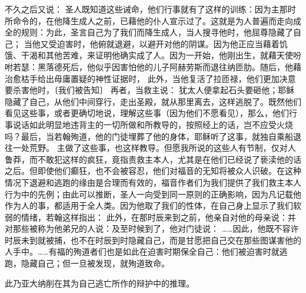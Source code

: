不久之后又说： 圣人既知道这些诫命，他们行事就有了这样的训练：因为主那时所命令的，在他降生成人之前，已藉他的仆人宣示过了。这就是为人普遍而走向成全的规则：为此，圣言自己为了我们而降生成人，当人搜寻他时，他屈尊隐藏了自己； 当他又受迫害时，他俯就退避，以避开对他的阴谋。因为他正应当藉着饥饿、干渴和其他苦难，来证明他确实成了人。因为一开始，他刚出生，就藉天使吩咐若瑟：黑落德死后，他似乎因害怕他的儿子阿赫劳斯而退往纳匝肋。随后，他藉治愈枯手给出毋庸置疑的神性证据时， 此外，当他复活了拉匝禄，他们更加决意要杀害他时，〔我们被告知〕 再者，当救主说： 犹太人便拿起石头要砸他；耶稣隐藏了自己，从他们中间穿行，走出圣殿，就从那里离去，这样逃脱了。既然他们看见这些事，或者更确切地说，理解这些事（因为他们不愿看见），那么，他们行事说话如此明显地违背主的一切所做和所教导的，按照经上的话，岂不应受火烧吗？最后，当若翰殉道，他的门徒埋葬了他的身体，耶稣听了这事，就独自乘船退往一处荒野。 主做了这些事，也这样教导。但愿我所说的这些人有节制，仅对人鲁莽，而不敢犯这样的疯狂，竟指责救主本人，尤其是在他们已经说了亵渎他的话之后。但即使他们癫狂，也不会被容忍，他们对福音的无知将被众人识破。在这种情况下退避和逃跑的缘由是合理而有效的，福音作者们为我们提供了我们救主本人行为中的先例；由此可以推断，圣人一向受到同一原则的正确影响，因为凡记载他作为人的事，都适用于全人类。因为他取了我们的性体，在自己身上显示了我们软弱的情绪，若翰这样指出： 此外，在那时辰来到之前，他亲自对他的母亲说：并对那些被称为他弟兄的人说：及至时候到了，他对门徒说： ……因此，他既不容许时辰未到就被捕，也不在时辰到时隐藏自己，而是甘愿把自己交在那些图谋害他的人手中。……有福的殉道者们也是如此在迫害时期保全自己：他们被迫害时就逃跑，隐藏自己；但一旦被发现，就殉道致命。\par

此乃亚大纳削在其为自己逃亡所作的辩护中的推理。\par

